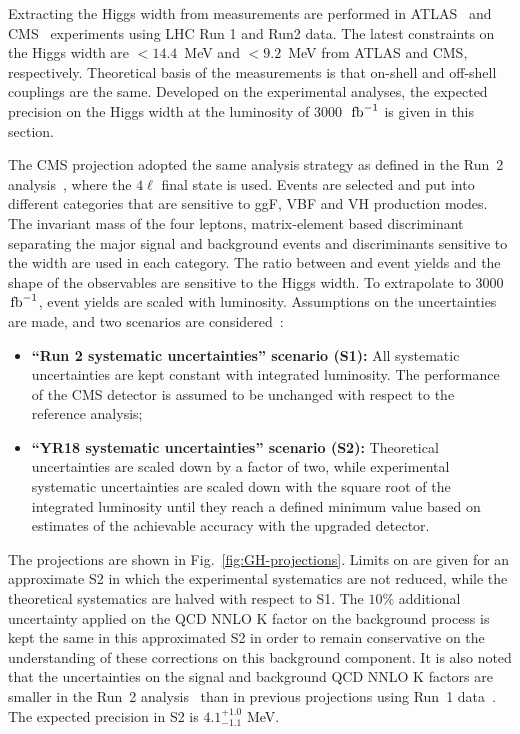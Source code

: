 
Extracting the Higgs width from \offshell measurements are performed in ATLAS~\cite{Aaboud:2018puo} and CMS~\cite{CMS:2018bwq} experiments using LHC Run 1 and Run2 data. The latest constraints on the Higgs width are $< 14.4$~MeV and $<9.2$~MeV from ATLAS and CMS, respectively. Theoretical basis of the measurements is that on-shell and off-shell couplings are the same. Developed on the experimental analyses, the expected precision on the Higgs width at the luminosity of 3000~$\,{\rm fb}^{-1}$ is given in this section.  

The CMS projection adopted the same analysis strategy as defined in the Run~2 analysis~\cite{CMS-PAS-HIG-18-002}, where the $4\ell$ final state is used. Events are selected and put into different categories that are sensitive to ggF, VBF and VH production modes. The invariant mass of the four leptons, matrix-element based discriminant separating the major signal and background events and discriminants sensitive to the width are used in each category. The ratio between \offshell and \onshell event yields and the shape of the observables are sensitive to the Higgs width. To extrapolate to 3000~$\,{\rm fb}^{-1}$, event yields are scaled with luminosity. Assumptions on the uncertainties are made, and two scenarios are considered~\cite{CMS-PAS-FTR-18-011}:
\begin{itemize}
\item {\bf ``Run 2 systematic uncertainties'' scenario (S1):} All systematic uncertainties are kept constant with
  integrated luminosity. The performance of the CMS detector is
  assumed to be unchanged with respect to the reference analysis;

\item {\bf ``YR18 systematic uncertainties'' scenario (S2):} Theoretical uncertainties are scaled down by a factor of two,
  while experimental systematic uncertainties are scaled down with the
  square root of the integrated luminosity until they reach a defined
  minimum value based on estimates of the achievable accuracy with the
  upgraded detector.
\end{itemize} 

The projections are shown in Fig.~\ref{fig:GH-projections}. Limits on \GH are given for an approximate S2 in which the experimental systematics are not reduced, while the theoretical systematics are halved with respect to S1. The $10\%$ additional uncertainty applied on the QCD NNLO K factor on the \glufu background process is kept the same in this approximated S2 in order to remain conservative on the understanding of these corrections on this background component. It is also noted that the uncertainties on the signal and background QCD NNLO K factors are smaller in the Run~2 analysis~\cite{CMS:2018bwq} than in previous projections using Run~1 data~\cite{ATL-PHYS-PUB-2015-024}. The expected \GH precision in S2 is $4.1 ^{+1.0}_{-1.1}$ MeV. 


